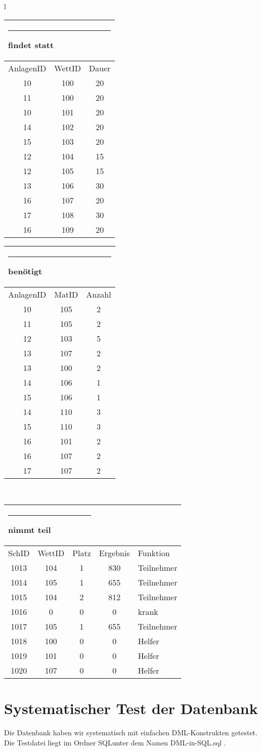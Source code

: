 \documentclass[pagesize,11pt,twoside]{scrartcl}
\def\TabKopf#1#2{\multicolumn{#2}{l}{\rule{1em}{0ex}\rule{0cm}{2.73ex}\textbf{#1}}\\\hline}
\begin{document}
\begin{tabular}[t]{l}
\begin{tabular}[t]{ccc}
 \TabKopf{findet statt}{3}
  AnlagenID&WettID&Dauer\\\hline
  10&100&20\\
  11&100&20\\
  10&101&20\\
  14&102&20\\
  15&103&20\\
  12&104&15\\
  12&105&15\\
  13&106&30\\
  16&107&20\\
  17&108&30\\
  16&109&20
\end{tabular}\hspace{1cm}
\begin{tabular}[t]{ccc}
 \TabKopf{benötigt}{3}
  AnlagenID&MatID&Anzahl\\\hline
  10&105&2\\
11&105&2\\
12&103&5\\
13&107&2\\
13&100&2\\
14&106&1\\
15&106&1\\
14&110&3\\
15&110&3\\
16&101&2\\
16&107&2\\
17&107&2\\
\end{tabular}\\
\begin{tabular}[b]{ccccl}
 \TabKopf{nimmt teil}{3}
  SchID&WettID&Platz&Ergebnis&Funktion\\\hline
1013&104&1&830&Teilnehmer\\
1014&105&1&655&Teilnehmer\\
1015&104&2&812&Teilnehmer\\
1016&0&0&0&krank\\
1017&105&1&655&Teilnehmer\\
1018&100&0&0&Helfer\\
1019&101&0&0&Helfer\\
1020&107&0&0&Helfer\\
\end{tabular}
\end{tabular}
\newpage
\normalsize
\section{Systematischer Test der Datenbank}
Die Datenbank haben wir systematisch mit einfachen DML-Konstrukten getestet. Die Testdatei liegt im Ordner \glqq SQL\grqq unter dem Namen \glqq DML-in-SQL.sql\grqq
.
\end{document}
